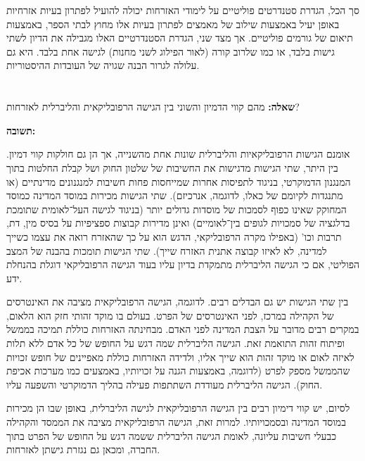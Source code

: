 \documentclass[]{../../../../tex/classes/homework}
\begin{document}
	סך הכל, הגדרת סטנדרטים פוליטיים על לימודי האזרחות יכולה להועיל לפתרון בעיות אזרחיות באופן יעיל באמצעות שילוב של מאמצים לפתרון בעיות אלו מחוץ לבתי הספר, באמצעות תיאום של גורמים פוליטיים. אך מצד שני, הגדרת הסטנדרטיים האלו מגבילה את הדיון לשתי גישות בלבד, או כמו שלרוב קורה (לאור הפילוג לשני מחנות) לגישה אחת בלבד. היא גם עלולה לגרור הבנה שגויה של העובדות ההיסטוריות. 
	
	\section{}
	\textbf{שאלה: }מהם קווי הדמיון והשוני בין הגישה הרפובליקאית והליברלית לאזרחות?
	
	\textbf{תשובה: }
	
	אומנם הגישות הרפובליקאיות והליברלית שונות אחת מהשנייה, אך הן גם חולקות קווי דמיון. בין היתר, שתי הגישות מדגישות את החשיבות של שלטון החוק ושל קבלת החלטות בתוך המנגנון הדמוקרטי, בניגוד לתפיסות אחרות שמייחסות פחות חשיבות למנגנונים מדינתיים (או מתנגדות לקיומם של כאלו, לדוגמה, אנרכיזם). שתי הגישות מכירות במוסד המדינה כמוסד המחוקק שאינו כפוף לסמכות של מוסדות גדולים יותר (בניגוד לגישה העל־לאומית שתומכת בדלגציה של סמכויות לגופים בין־לאומיים) ואינן מדירות קבוצות ספציפיות על בסיס מין, דת, תרבות וכו' (באפילו מקרה הרפובליקאי, הדגש הוא על כך שהאזרח רואה את עצמו כשייך למדינה, לא לאיזו קבוצה אתנית האזרח שייך). שתי הגישות תומכות בהבנה של המצב הפוליטי, אם כי הגישה הליברלית מתמקדת בדיון עליו בעוד הגישה הרפובליקאי דוגלת בהנחלת ידע. 
	
	\npage
	
	בין שתי הגישות יש גם הבדלים רבים. לדוגמה, הגישה הרפובליקאית מציבה את האינטרסים של הקהילה במרכז, לפני האינטרסים של הפרט. בעולם בו מוקד זהותי חזק הוא הלאום, במקרים רבים מדובר על הצבת המדינה לפני האדם. מבחינתה האזרחות כוללת תמיכה בממשל ופיתוח זהות התואמת זאת. הגישה הליברלית שמה דגש על החופש של כל אדם ללא תלות לאיזה לאום או מוקד זהות הוא שייך אליו, ולדידה האזרחות כוללת מאפיינים של חופש זכויות שהממשל מספק לפרט (לדוגמה, באמצעות הגנה על זכויותיו, באמצעים כמו מערכות אכיפת החוק). הגישה הליברלית מעודדת השתתפות פעילה בהליך הדמוקרטי והשפעה עליו. 
	
	לסיום, יש קווי דימיון רבים בין הגישה הרפובליקאית לגישה הליברלית, באופן שבו הן מכירות במוסד המדינה ובסמכויותיו. למרות זאת, הגישה הרפובליקאית מציבה את הממסד והקהילה כבעלי חשיבות עליונה, לאומת הגישה הליברלית ששמה דגש על החופש של הפרט בתוך החברה, ומכאן גם נגזרת גישתן לאזרחות. 
	
	
	
	
	\ndoc
\end{document}
